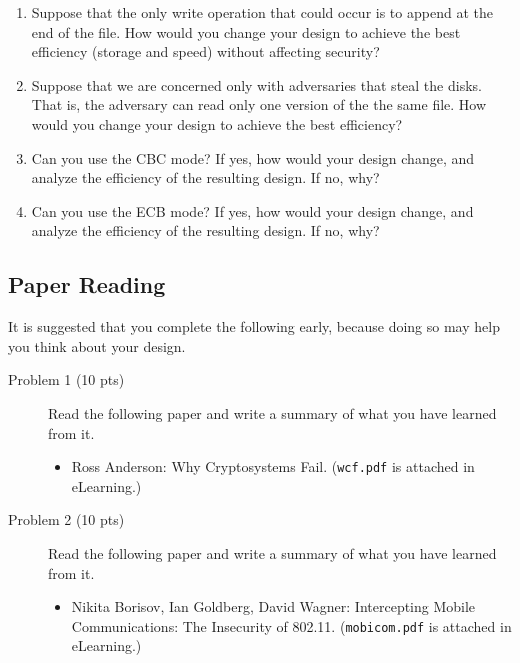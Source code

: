 \documentclass[11pt]{article}
\begin{document}
\begin{enumerate}

    \item Suppose that the only write operation that could occur is to append at the end of the file. How would you change your design to achieve the best efficiency (storage and speed) without affecting security?

    \item Suppose that we are concerned only with adversaries that steal the disks.  That is, the adversary can read only one version of the the same file.  How would you change your design to achieve the best efficiency?

    \item Can you use the CBC mode?  If yes, how would your design change, and analyze the efficiency of the resulting design.  If no, why?

    \item Can you use the ECB mode?  If yes, how would your design change, and analyze the efficiency of the resulting design.  If no, why?

\end{enumerate}


\subsection{Paper Reading}

It is suggested that you complete the following early, because doing so may help you think about your design.

\begin{description}
 \item[Problem 1 (10 pts)]
Read the following paper and write a summary of what you have learned from it.

\begin{itemize}
 \item
Ross Anderson: Why Cryptosystems Fail. (\texttt{wcf.pdf} is attached in eLearning.)
\end{itemize}



 \item [Problem 2 (10 pts)]
Read the following paper and write a summary of what you have learned from it.

\begin{itemize}
 \item
Nikita Borisov, Ian Goldberg, David Wagner: Intercepting Mobile Communications:
The Insecurity of 802.11.  (\texttt{mobicom.pdf} is attached in eLearning.)
\end{itemize}


\end{description}
\end{document}
